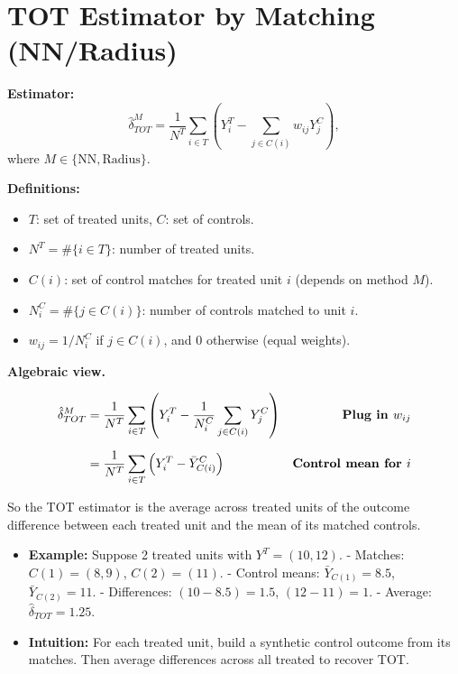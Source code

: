 \documentclass[12pt]{article}
\begin{document}
\section*{\noindent\textbf{TOT Estimator by Matching (NN/Radius)}}

\textbf{Estimator:}
\[
\hat{\delta}_{TOT}^M 
   = \frac{1}{N^T} \sum_{i \in T} 
     \left( Y_i^T - \sum_{j \in C(i)} w_{ij} Y_j^C \right),
\]
where $M \in \{\text{NN}, \text{Radius}\}$.

\textbf{Definitions:}
\begin{itemize}
    \item $T$: set of treated units, $C$: set of controls.
    \item $N^T = \#\{i \in T\}$: number of treated units.
    \item $C(i)$: set of control matches for treated unit $i$ (depends on method $M$).
    \item $N_i^C = \#\{ j \in C(i)\}$: number of controls matched to unit $i$.
    \item $w_{ij} = 1/N_i^C$ if $j \in C(i)$, and $0$ otherwise (equal weights).
\end{itemize}

\textbf{Algebraic view.}

\singlespacing
\begin{align}
\hat{\delta}_{TOT}^M 
   &= \frac{1}{N^T} \sum_{i \in T} 
      \left( Y_i^T - \frac{1}{N_i^C} \sum_{j \in C(i)} Y_j^C \right)
   & \text{\textbf{Plug in $w_{ij}$}} \\[6pt]
   &= \frac{1}{N^T} \sum_{i \in T} 
      \left( Y_i^T - \bar{Y}_{C(i)}^C \right)
   & \text{\textbf{Control mean for $i$}}
\end{align}

So the TOT estimator is the average across treated units of the outcome difference between each treated unit and the mean of its matched controls.

\begin{itemize}
    \item \textbf{Example:} Suppose 2 treated units with $Y^T=(10,12)$.  
      - Matches: $C(1)=(8,9)$, $C(2)=(11)$.  
      - Control means: $\bar{Y}_{C(1)}=8.5$, $\bar{Y}_{C(2)}=11$.  
      - Differences: $(10-8.5)=1.5$, $(12-11)=1$.  
      - Average: $\hat{\delta}_{TOT}=1.25$.  
    \item \textbf{Intuition:} For each treated unit, build a synthetic control outcome from its matches. Then average differences across all treated to recover TOT.  
\end{itemize}
\end{document}

